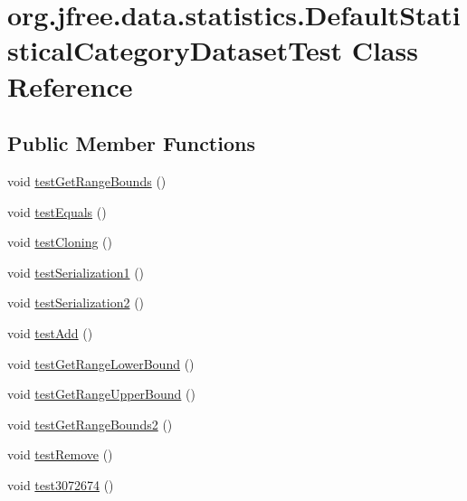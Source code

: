\hypertarget{classorg_1_1jfree_1_1data_1_1statistics_1_1_default_statistical_category_dataset_test}{}\section{org.\+jfree.\+data.\+statistics.\+Default\+Statistical\+Category\+Dataset\+Test Class Reference}
\label{classorg_1_1jfree_1_1data_1_1statistics_1_1_default_statistical_category_dataset_test}
\subsection*{Public Member Functions}
\begin{DoxyCompactItemize}
\item 
void \mbox{\hyperlink{classorg_1_1jfree_1_1data_1_1statistics_1_1_default_statistical_category_dataset_test_ab0b84a6e2dbe7a8a704c7156ab8868ea}{test\+Get\+Range\+Bounds}} ()
\item 
void \mbox{\hyperlink{classorg_1_1jfree_1_1data_1_1statistics_1_1_default_statistical_category_dataset_test_af7185abfed79f12c7ffae6baff8f8769}{test\+Equals}} ()
\item 
void \mbox{\hyperlink{classorg_1_1jfree_1_1data_1_1statistics_1_1_default_statistical_category_dataset_test_aeec7c0948e8d4ac60610c088469a0c33}{test\+Cloning}} ()
\item 
void \mbox{\hyperlink{classorg_1_1jfree_1_1data_1_1statistics_1_1_default_statistical_category_dataset_test_a8c976b1797c823d156098d81784b0a9a}{test\+Serialization1}} ()
\item 
void \mbox{\hyperlink{classorg_1_1jfree_1_1data_1_1statistics_1_1_default_statistical_category_dataset_test_a2e529490572b3fb18d4e7de58f4d2f8f}{test\+Serialization2}} ()
\item 
void \mbox{\hyperlink{classorg_1_1jfree_1_1data_1_1statistics_1_1_default_statistical_category_dataset_test_a7f207d5fbacf5ed44d3d4b5eac514b46}{test\+Add}} ()
\item 
void \mbox{\hyperlink{classorg_1_1jfree_1_1data_1_1statistics_1_1_default_statistical_category_dataset_test_a0fe7342e68094e9afad52f0f40cb52eb}{test\+Get\+Range\+Lower\+Bound}} ()
\item 
void \mbox{\hyperlink{classorg_1_1jfree_1_1data_1_1statistics_1_1_default_statistical_category_dataset_test_a5c57b69381f53be30672a2dc052df8a7}{test\+Get\+Range\+Upper\+Bound}} ()
\item 
void \mbox{\hyperlink{classorg_1_1jfree_1_1data_1_1statistics_1_1_default_statistical_category_dataset_test_acf6d3c64b1cbb37d3590d32e0bf8aab3}{test\+Get\+Range\+Bounds2}} ()
\item 
void \mbox{\hyperlink{classorg_1_1jfree_1_1data_1_1statistics_1_1_default_statistical_category_dataset_test_a8e29ab877f07e17cf26d887bc9fbdda7}{test\+Remove}} ()
\item 
void \mbox{\hyperlink{classorg_1_1jfree_1_1data_1_1statistics_1_1_default_statistical_category_dataset_test_a9f476995bbeb6e159e12f45b2715e092}{test3072674}} ()
\end{DoxyCompactItemize}


